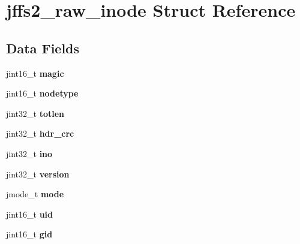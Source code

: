 \hypertarget{structjffs2__raw__inode}{}\section{jffs2\+\_\+raw\+\_\+inode Struct Reference}
\label{structjffs2__raw__inode}
\subsection*{Data Fields}
\begin{DoxyCompactItemize}
\item 
\mbox{\label{structjffs2__raw__inode_a306ef0f03bb59cd1a4d2a0ee1f3841c4}} 
jint16\+\_\+t {\bfseries magic}
\item 
\mbox{\label{structjffs2__raw__inode_a5131df96c4f3f1fecdc16a108353d428}} 
jint16\+\_\+t {\bfseries nodetype}
\item 
\mbox{\label{structjffs2__raw__inode_a4a44558f1b3c1918646522f520da90af}} 
jint32\+\_\+t {\bfseries totlen}
\item 
\mbox{\label{structjffs2__raw__inode_a878290cc1a66ffcf0a35396e96fca1be}} 
jint32\+\_\+t {\bfseries hdr\+\_\+crc}
\item 
\mbox{\label{structjffs2__raw__inode_a4ab1cd1feafc582e64656a57f368acaf}} 
jint32\+\_\+t {\bfseries ino}
\item 
\mbox{\label{structjffs2__raw__inode_a1b46d87683e29679e487776230ef2d76}} 
jint32\+\_\+t {\bfseries version}
\item 
\mbox{\label{structjffs2__raw__inode_a3aab62c753a07799ca147dc9b0f8a021}} 
jmode\+\_\+t {\bfseries mode}
\item 
\mbox{\label{structjffs2__raw__inode_aadfa8243f8773a72c0401a4b07e591a0}} 
jint16\+\_\+t {\bfseries uid}
\item 
\mbox{\label{structjffs2__raw__inode_a47951d261863dfb429b5a004f5566dd4}} 
jint16\+\_\+t {\bfseries gid}

\end{DoxyCompactItemize}
